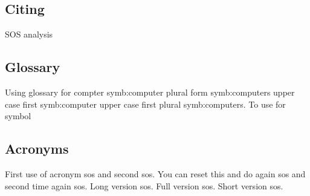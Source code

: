 \subsection{Citing}
\cite{sos} SOS analysis 
\subsection{Glossary}
Using glossary for compter \gls{symb:computer} plural form \glspl{symb:computer}
upper case first \Gls{symb:computer} upper case first plural \Glspl{symb:computer}. To use for symbol 

\subsection{Acronyms}
First use of acronym \gls{sos} and second \gls{sos}. 
You can reset this and do again  \gls{sos} and second time again \gls{sos}. 
Long version \acrlong{sos}.
Full version \acrfull{sos}.
Short version \acrshort{sos}.
